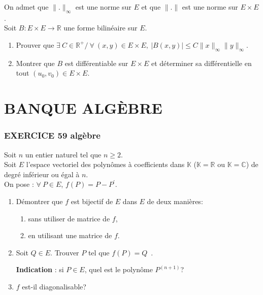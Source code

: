 \documentclass[10pt,oneside]{article}
\begin{document}
\begin{flushleft}
\begin{enumerate}
\medskip

 On admet que $\|.\|_{\infty}$  est une norme sur $E$ et que $\|.\|$ est une norme sur $E\times E$.\\
 \medskip
 Soit $B:E\times E\longrightarrow \mathbb{R}$ une forme bilinéaire sur $E$.\\
 \begin{enumerate}
 \item
  Prouver que $\exists\: C\in\mathbb{R}^+/\:\forall\:(x,y)\in E\times E,\:|B(x,y)|\leqslant C\|x\|_{\infty}\|y\|_{\infty}$.
  \item
   Montrer que $B$ est différentiable sur $E\times E$ et déterminer sa différentielle en tout $(u_0,v_0)\in E\times E$.
  
  \end{enumerate}
\end{enumerate}

 \pagebreak
 \part*{BANQUE ALGÈBRE}
 \section*{EXERCICE 59 \: algèbre }
Soit $n$ un entier naturel tel que $n\geqslant 2$.\\
Soit $E$ l'espace vectoriel des polyn\^{o}mes \`{a} coefficients dans $\mathbb{K}$ ($\mathbb{K}=\mathbb{R}$ ou $\mathbb{K}=\mathbb{C}$) de degr\'{e} inf\'{e}rieur ou \'{e}gal \`{a} $n$.\\
On pose : $\forall\:P\in E$,  $f\left( P\right)=P-P^{\prime }$.

\begin{enumerate}
\item D\'{e}montrer que $f$ est bijectif de $E$ dans $E$ de deux mani\`{e}res:
	\begin{enumerate}
	\item sans utiliser de matrice de $f$, 
	\item en utilisant une matrice de $f$.  
	\end{enumerate}
	
\item Soit $Q\in E.$ Trouver $P$ tel que $f\left( P\right) =Q$~.

\textbf{Indication }: si $P\in E$, quel est le polyn\^{o}me $P^{\left(n+1\right) }$? 
\item
$f$ est-il diagonalisable?

\end{enumerate}


\end{flushleft}
\end{document}

